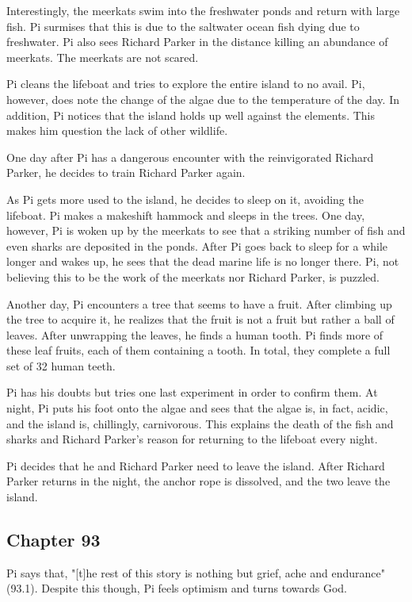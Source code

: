 \documentclass[11pt]{article}
\begin{document}
Interestingly, the meerkats swim into the freshwater ponds and return with large fish. Pi surmises that this is due to the saltwater ocean fish dying due to freshwater. Pi also sees Richard Parker in the distance killing an abundance of meerkats. The meerkats are not scared.

Pi cleans the lifeboat and tries to explore the entire island to no avail. Pi, however, does note the change of the algae due to the temperature of the day. In addition, Pi notices that the island holds up well against the elements. This makes him question the lack of other wildlife.

One day after Pi has a dangerous encounter with the reinvigorated Richard Parker, he decides to train Richard Parker again.

As Pi gets more used to the island, he decides to sleep on it, avoiding the lifeboat. Pi makes a makeshift hammock and sleeps in the trees. One day, however, Pi is woken up by the meerkats to see that a striking number of fish and even sharks are deposited in the ponds. After Pi goes back to sleep for a while longer and wakes up, he sees that the dead marine life is no longer there. Pi, not believing this to be the work of the meerkats nor Richard Parker, is puzzled.

Another day, Pi encounters a tree that seems to have a fruit. After climbing up the tree to acquire it, he realizes that the fruit is not a fruit but rather a ball of leaves. After unwrapping the leaves, he finds a human tooth. Pi finds more of these leaf fruits, each of them containing a tooth. In total, they complete a full set of 32 human teeth.

Pi has his doubts but tries one last experiment in order to confirm them. At night, Pi puts his foot onto the algae and sees that the algae is, in fact, acidic, and the island is, chillingly, carnivorous. This explains the death of the fish and sharks and Richard Parker's reason for returning to the lifeboat every night.

Pi decides that he and Richard Parker need to leave the island. After Richard Parker returns in the night, the anchor rope is dissolved, and the two leave the island.
\subsection{Chapter 93}
\label{sec:orgc788468}
Pi says that, "[t]he rest of this story is nothing but grief, ache and endurance" (93.1). Despite this though, Pi feels optimism and turns towards God.
\end{document}
